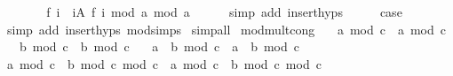 \begin{isabellebody}
\ \ \isamarkupfalse%
\ \isamarkupfalse%
\ {\isachardoublequoteopen}{\isasymdots}\ {\isacharequal}{\kern0pt}\ {\isacharparenleft}{\kern0pt}f\ i\ {\isacharasterisk}{\kern0pt}\ {\isacharparenleft}{\kern0pt}{\isacharparenleft}{\kern0pt}{\isasymProd}i{\isasymin}A{\isachardot}{\kern0pt}\ f\ i{\isacharparenright}{\kern0pt}\ mod\ a{\isacharparenright}{\kern0pt}{\isacharparenright}{\kern0pt}\ mod\ a{\isachardoublequoteclose}\isanewline
\ \ \ \ \isamarkupfalse%
\ {\isacharparenleft}{\kern0pt}simp\ add{\isacharcolon}{\kern0pt}\ insert{\isachardot}{\kern0pt}hyps{\isacharparenright}{\kern0pt}\isanewline
\ \ \isamarkupfalse%
\ \isamarkupfalse%
\ {\isacharquery}{\kern0pt}case\isanewline
\ \ \ \ \isamarkupfalse%
\ {\isacharparenleft}{\kern0pt}simp\ add{\isacharcolon}{\kern0pt}\ insert{\isachardot}{\kern0pt}hyps\ mod{\isacharunderscore}{\kern0pt}simps{\isacharparenright}{\kern0pt}\isanewline
{}\isamarkupfalse%
\ simp{\isacharunderscore}{\kern0pt}all%
\endisatagproof
{\isafoldproof}%
%
\isadelimproof
\isanewline
%
\endisadelimproof
\isanewline
{}\isamarkupfalse%
\ mod{\isacharunderscore}{\kern0pt}mult{\isacharunderscore}{\kern0pt}cong{\isacharcolon}{\kern0pt}\isanewline
\ \ \ {\isachardoublequoteopen}a\ mod\ c\ {\isacharequal}{\kern0pt}\ a{\isacharprime}{\kern0pt}\ mod\ c{\isachardoublequoteclose}\isanewline
\ \ \ {\isachardoublequoteopen}b\ mod\ c\ {\isacharequal}{\kern0pt}\ b{\isacharprime}{\kern0pt}\ mod\ c{\isachardoublequoteclose}\isanewline
\ \ \ {\isachardoublequoteopen}{\isacharparenleft}{\kern0pt}a\ {\isacharasterisk}{\kern0pt}\ b{\isacharparenright}{\kern0pt}\ mod\ c\ {\isacharequal}{\kern0pt}\ {\isacharparenleft}{\kern0pt}a{\isacharprime}{\kern0pt}\ {\isacharasterisk}{\kern0pt}\ b{\isacharprime}{\kern0pt}{\isacharparenright}{\kern0pt}\ mod\ c{\isachardoublequoteclose}\isanewline
%
\isadelimproof
%
\endisadelimproof
%
\isatagproof
{}\isamarkupfalse%
\ {\isacharminus}{\kern0pt}\isanewline
\ \ \isamarkupfalse%
\ {\isachardoublequoteopen}{\isacharparenleft}{\kern0pt}a\ mod\ c\ {\isacharasterisk}{\kern0pt}\ {\isacharparenleft}{\kern0pt}b\ mod\ c{\isacharparenright}{\kern0pt}{\isacharparenright}{\kern0pt}\ mod\ c\ {\isacharequal}{\kern0pt}\ {\isacharparenleft}{\kern0pt}a{\isacharprime}{\kern0pt}\ mod\ c\ {\isacharasterisk}{\kern0pt}\ {\isacharparenleft}{\kern0pt}b{\isacharprime}{\kern0pt}\ mod\ c{\isacharparenright}{\kern0pt}{\isacharparenright}{\kern0pt}\ mod\ c{\isachardoublequoteclose}\isanewline

\end{isabellebody}
